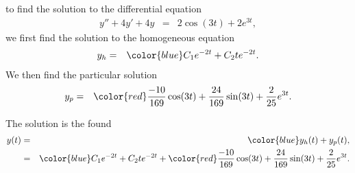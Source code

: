 \begin{frame}

  to find the solution to the differential equation
  \begin{eqnarray*}
    y'' + 4y' + 4y & = & 2 \cos(3t) + 2e^{3t},
  \end{eqnarray*}
  we first find the solution to the homogeneous equation
  \begin{eqnarray*}
    y_h & = & {\color{blue}C_1 e^{-2t} + C_2 t e^{-2t}}.
  \end{eqnarray*}
  We then find the particular solution
  \begin{eqnarray*}
    y_p & = & {\color{red}\frac{-10}{169}\cos(3t) + \frac{24}{169} \sin(3t) + \frac{2}{25}  e^{3t}}.
  \end{eqnarray*}

  The solution is the found
  \begin{eqnarray*}
    y(t) & = & {\color{blue}y_h(t)} + y_p(t), \\
         & = & {\color{blue}C_1 e^{-2t} + C_2 t e^{-2t}} + {\color{red}\frac{-10}{169}\cos(3t) +
               \frac{24}{169} \sin(3t) + \frac{2}{25}  e^{3t}}.
  \end{eqnarray*}
  
\end{frame}



